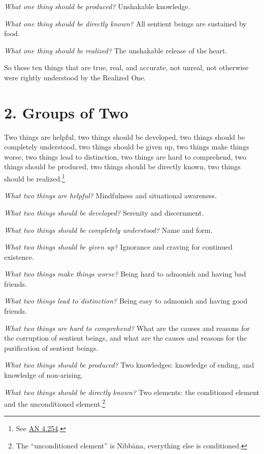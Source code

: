 \documentclass[12pt,openany]{book}%
\begin{document}
\emph{What one thing should be produced?} Unshakable knowledge. 

\emph{What one thing should be directly known?} All sentient beings are sustained by food. 

\emph{What one thing should be realized?} The unshakable release of the heart. 

So these ten things that are true, real, and accurate, not unreal, not otherwise were rightly understood by the Realized One. 

\section*{2. Groups of Two }

Two things are helpful, two things should be developed, two things should be completely understood, two things should be given up, two things make things worse, two things lead to distinction, two things are hard to comprehend, two things should be produced, two things should be directly known, two things should be realized.\footnote{See \href{https://suttacentral.net/an4.254/en/sujato}{AN 4.254}. } 

\emph{What two things are helpful?} Mindfulness and situational awareness. 

\emph{What two things should be developed?} Serenity and discernment. 

\emph{What two things should be completely understood?} Name and form. 

\emph{What two things should be given up?} Ignorance and craving for continued existence. 

\emph{What two things make things worse?} Being hard to admonish and having bad friends. 

\emph{What two things lead to distinction?} Being easy to admonish and having good friends. 

\emph{What two things are hard to comprehend?} What are the causes and reasons for the corruption of sentient beings, and what are the causes and reasons for the purification of sentient beings. 

\emph{What two things should be produced?} Two knowledges: knowledge of ending, and knowledge of non-arising. 

\emph{What two things should be directly known?} Two elements: the conditioned element and the unconditioned element.\footnote{The “unconditioned element” is \textsanskrit{Nibbāna}, everything else is conditioned. } 
\end{document}

